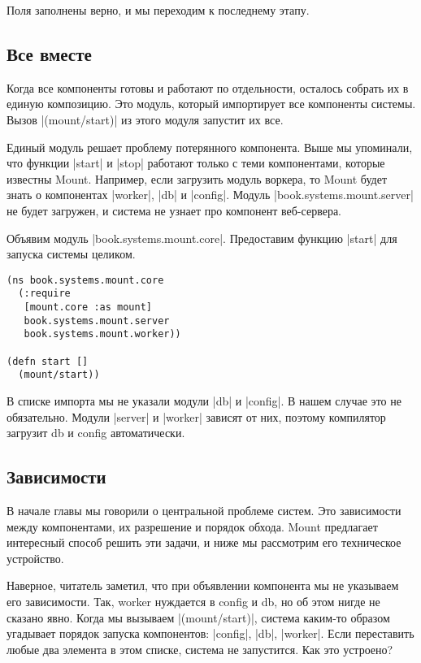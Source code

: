 Поля заполнены верно, и мы переходим к последнему этапу.

\subsection{Все вместе}

Когда все компоненты готовы и работают по отдельности, осталось собрать их в
единую композицию. Это модуль, который импортирует все компоненты системы. Вызов
\spverb|(mount/start)| из этого модуля запустит их все.

Единый модуль решает проблему потерянного компонента. Выше мы упоминали, что
функции \spverb|start| и \spverb|stop| работают только с теми компонентами, которые известны
Mount. Например, если загрузить модуль воркера, то Mount будет знать о
компонентах \spverb|worker|, \spverb|db| и \spverb|config|. Модуль \spverb|book.systems.mount.server| не
будет загружен, и система не узнает про компонент веб-сервера.

Объявим модуль \spverb|book.systems.mount.core|. Предоставим функцию \spverb|start| для
запуска системы целиком.

\begin{verbatim}
(ns book.systems.mount.core
  (:require
   [mount.core :as mount]
   book.systems.mount.server
   book.systems.mount.worker))

(defn start []
  (mount/start))
\end{verbatim}

В списке импорта мы не указали модули \spverb|db| и \spverb|config|. В нашем случае это не
обязательно. Модули \spverb|server| и \spverb|worker| зависят от них, поэтому компилятор
загрузит db и config автоматически.

\subsection{Зависимости}

В начале главы мы говорили о центральной проблеме систем. Это зависимости между
компонентами, их разрешение и порядок обхода. Mount предлагает интересный способ
решить эти задачи, и ниже мы рассмотрим его техническое устройство.

Наверное, читатель заметил, что при объявлении компонента мы не указываем его
зависимости. Так, worker нуждается в config и db, но об этом нигде не сказано
явно. Когда мы вызываем \spverb|(mount/start)|, система каким-то образом угадывает
порядок запуска компонентов: \spverb|config|, \spverb|db|, \spverb|worker|. Если переставить любые
два элемента в этом списке, система не запустится. Как это устроено?

